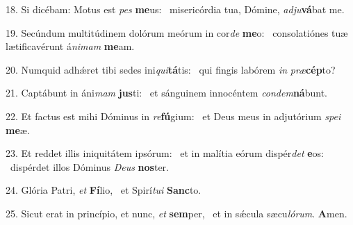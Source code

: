 18. Si dicébam: Motus est \textit{pes} \textbf{me}us: \ast\  misericórdia tua, Dómine, \textit{ad}\textit{ju}\textbf{vá}bat me.\

19. Secúndum multitúdinem dolórum meórum in cor\textit{de} \textbf{me}o: \ast\  consolatiónes tuæ lætificavérunt á\textit{ni}\textit{mam} \textbf{me}am.\

20. Numquid adhǽret tibi sedes ini\textit{qui}\textbf{tá}tis: \ast\  qui fingis labórem \textit{in} \textit{præ}\textbf{cép}to?\

21. Captábunt in áni\textit{mam} \textbf{jus}ti: \ast\  et sánguinem innocéntem \textit{con}\textit{dem}\textbf{ná}bunt.\

22. Et factus est mihi Dóminus in \textit{re}\textbf{fú}gium: \ast\  et Deus meus in adjutórium \textit{spe}\textit{i} \textbf{me}æ.\

23. Et reddet illis iniquitátem ipsórum: \dag\  et in malítia eórum dispér\textit{det} \textbf{e}os: \ast\  dispérdet illos Dóminus \textit{De}\textit{us} \textbf{nos}ter.\

24. Glória Patri, \textit{et} \textbf{Fí}lio, \ast\  et Spirí\textit{tu}\textit{i} \textbf{Sanc}to.\

25. Sicut erat in princípio, et nunc, \textit{et} \textbf{sem}per, \ast\  et in sǽcula sæcu\textit{ló}\textit{rum}. \textbf{A}men.\

